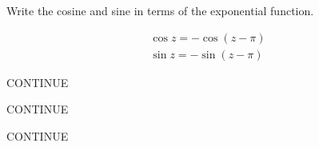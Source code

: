 {\begin{Hint}
  Write the cosine and sine in terms of the exponential function.
\end{Hint}


\begin{Hint}
  \label{hint taylor cosine sine}
  \begin{gather*}
    \cos z = - \cos(z - \pi)
    \\
    \sin z = - \sin(z - \pi)
  \end{gather*}
\end{Hint}


\begin{Hint}
  \label{hint sum taylor series}
  CONTINUE
\end{Hint}


\begin{Hint}
  \label{hint 3 terms e-z}
  CONTINUE
\end{Hint}




\begin{Hint}
  \label{hint laurent 1/(z-i)}
\end{Hint}


\begin{Hint}
  \label{hint laurent 1/((z+1)(z+2))}
\end{Hint}


\begin{Hint}
  \label{hint int (cos t)^m cos nt}
\end{Hint}


\begin{Hint}
  \label{hint int f = i 2 pi}
\end{Hint}


\begin{Hint}
  \label{hint sum k^3 (z/3)^k}
\end{Hint}


\begin{Hint}
  \label{hint laurent 1z1z}
  CONTINUE
\end{Hint}



\raggedbottom
}
